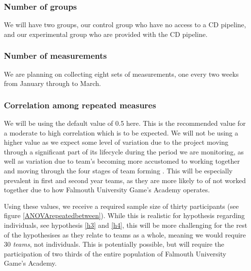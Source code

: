 \documentclass[lettersize,journal]{IEEEtran}
\begin{document}
        \subsubsection*{Number of groups}
            We will have two groups, our control group who have no access to a CD pipeline, and our experimental group who are provided with the CD pipeline.\\

        \subsubsection*{Number of measurements}
            We are planning on collecting eight sets of measurements, one every two weeks from January through to March.\\
            
        \subsubsection*{Correlation among repeated measures}
            We will be using the default value of 0.5 here. This is the recommended value for a moderate to high correlation \cite{gpowerguide} which is to be expected. We will not be using a higher value as we expect some level of variation due to the project moving through a significant part of its lifecycle during the period we are monitoring, as well as variation due to team's becoming more accustomed to working together and moving through the four stages of team forming \cite{tuckman1965developmental}. This will be especially prevalent in first and second year teams, as they are more likely to of not worked together due to how Falmouth University Game's Academy operates.

        Using these values, we receive a required sample size of thirty participants (see figure \ref{ANOVArepeatedbetween}). While this is realistic for hypothesis regarding individuals, see hypothesis \ref{h3} and \ref{h4}, this will be more challenging for the rest of the hypothesises as they relate to teams as a whole, meaning we would require 30 \textit{teams}, not individuals. This is potentially possible, but will require the participation of two thirds of the entire population of Falmouth University Game's Academy.
\end{document}
